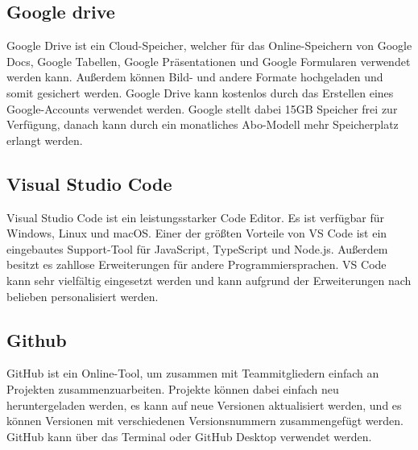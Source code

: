 \subsection{Google drive}
Google Drive ist ein Cloud-Speicher, welcher für das Online-Speichern von Google Docs, Google Tabellen, Google Präsentationen und Google Formularen verwendet werden kann. Außerdem können Bild- und andere Formate hochgeladen und somit gesichert werden. Google Drive kann kostenlos durch das Erstellen eines Google-Accounts verwendet werden. Google stellt dabei 15GB Speicher frei zur Verfügung, danach kann durch ein monatliches Abo-Modell mehr Speicherplatz erlangt werden. 
 
\subsection{Visual Studio Code}
Visual Studio Code ist ein leistungsstarker Code Editor. Es ist verfügbar für Windows, Linux und macOS. 
Einer der größten Vorteile von VS Code ist ein eingebautes Support-Tool für JavaScript, TypeScript und Node.js. Außerdem besitzt es zahllose Erweiterungen für andere Programmiersprachen. VS Code kann sehr vielfältig eingesetzt werden und kann aufgrund der Erweiterungen nach belieben personalisiert werden. 
 
\subsection{Github}
GitHub ist ein Online-Tool, um zusammen mit Teammitgliedern einfach an Projekten zusammenzuarbeiten. Projekte können dabei einfach neu heruntergeladen werden, es kann auf neue Versionen aktualisiert werden, und es können Versionen mit verschiedenen Versionsnummern zusammengefügt werden. GitHub kann über das Terminal oder GitHub Desktop verwendet werden.
